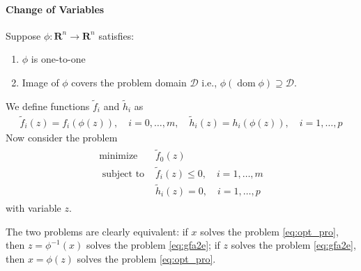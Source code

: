 \documentclass{article}
\begin{document}
\paragraph{Change of Variables}
Suppose $\phi: \mathbf{R}^{n} \rightarrow \mathbf{R}^{n}$ satisfies:
\begin{enumerate}
    \item $\phi$ is one-to-one
    \item Image of $\phi$ covers the problem domain $\mathcal{D}$ i.e., $\phi(\operatorname{dom} \phi) \supseteq \mathcal{D} .$
\end{enumerate} We define functions $\tilde{f}_{i}$ and $\tilde{h}_{i}$ as
\begin{align*}
\tilde{f}_{i}(z)=f_{i}(\phi(z)), \quad i=0, \ldots, m, \quad \tilde{h}_{i}(z)=h_{i}(\phi(z)), \quad i=1, \ldots, p
\end{align*}
Now consider the problem
\begin{align}
\begin{array}{ll}
\operatorname{minimize} & \tilde{f}_{0}(z) \\
\text { subject to } & \tilde{f}_{i}(z) \leq 0, \quad i=1, \ldots, m \\
& \tilde{h}_{i}(z)=0, \quad i=1, \ldots, p
\end{array}\label{eq:gfa2e}
\end{align}
with variable $z .$ 

The two problems are clearly equivalent: if $x$ solves the problem \cref{eq:opt_pro}, then $z=\phi^{-1}(x)$ solves the problem \cref{eq:gfa2e}; if $z$ solves the problem \cref{eq:gfa2e}, then $x=\phi(z)$ solves the problem \cref{eq:opt_pro}.
\end{document}
